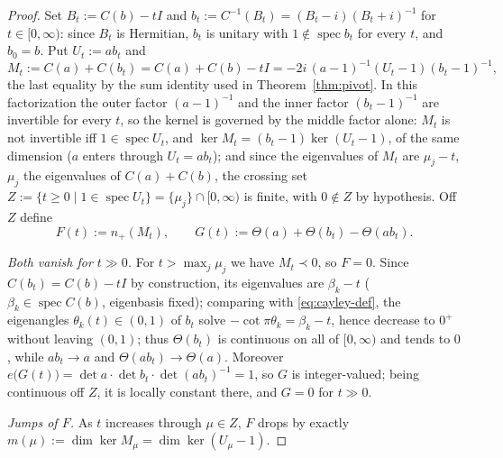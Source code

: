 \documentclass[11pt]{article}
\theoremstyle{definition}
\begin{document}
\begin{proof}
Set $B_t:=C(b)-tI$ and $b_t:=C^{-1}(B_t)=(B_t-i)(B_t+i)^{-1}$ for
$t\in[0,\infty)$: since $B_t$ is Hermitian, $b_t$ is unitary with
$1\notin\operatorname{spec}b_t$ for every $t$, and $b_0=b$. Put
$U_t:=ab_t$ and
\[
M_t:=C(a)+C(b_t)=C(a)+C(b)-tI
=-2i\,(a-1)^{-1}(U_t-1)(b_t-1)^{-1},
\]
the last equality by the sum identity used in
Theorem~\ref{thm:pivot}. In this factorization the outer factor
$(a-1)^{-1}$ and the inner factor $(b_t-1)^{-1}$ are invertible for
every $t$, so the kernel is governed by the middle factor alone:
$M_t$ is not invertible iff $1\in\operatorname{spec}U_t$, and
$\ker M_t=(b_t-1)\ker(U_t-1)$, of the same dimension ($a$ enters
through $U_t=ab_t$); and since the
eigenvalues of $M_t$ are $\mu_j-t$, $\mu_j$ the eigenvalues of
$C(a)+C(b)$, the crossing set
$Z:=\{t\ge0\mid 1\in\operatorname{spec}U_t\}=\{\mu_j\}\cap[0,\infty)$
is finite, with $0\notin Z$ by hypothesis. Off $Z$ define
\[
F(t):=n_{+}(M_t),\qquad
G(t):=\Theta(a)+\Theta(b_t)-\Theta(ab_t).
\]

\emph{Both vanish for $t\gg0$.} For $t>\max_j\mu_j$ we have
$M_t\prec0$, so $F=0$. Since $C(b_t)=C(b)-tI$ by construction, its eigenvalues are
$\beta_k-t$ ($\beta_k\in\operatorname{spec}C(b)$, eigenbasis fixed);
comparing with \eqref{eq:cayley-def}, the eigenangles
$\theta_k(t)\in(0,1)$ of $b_t$ solve $-\cot\pi\theta_k=\beta_k-t$,
hence decrease to $0^{+}$ without leaving $(0,1)$; thus $\Theta(b_t)$ is continuous on all of
$[0,\infty)$ and tends to $0$, while $ab_t\to a$ and
$\Theta(ab_t)\to\Theta(a)$. Moreover
$e\bigl(G(t)\bigr)=\det a\cdot\det b_t\cdot\det(ab_t)^{-1}=1$, so $G$
is integer-valued; being continuous off $Z$, it is locally constant
there, and $G=0$ for $t\gg0$.

\emph{Jumps of $F$.} As $t$ increases through $\mu\in Z$, $F$ drops by
exactly $m(\mu):=\dim\ker M_{\mu}=\dim\ker(U_{\mu}-1)$.


\end{proof}
\end{document}
